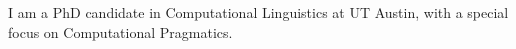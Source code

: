 I am a PhD candidate in Computational Linguistics at UT Austin, with a special focus on Computational Pragmatics.
